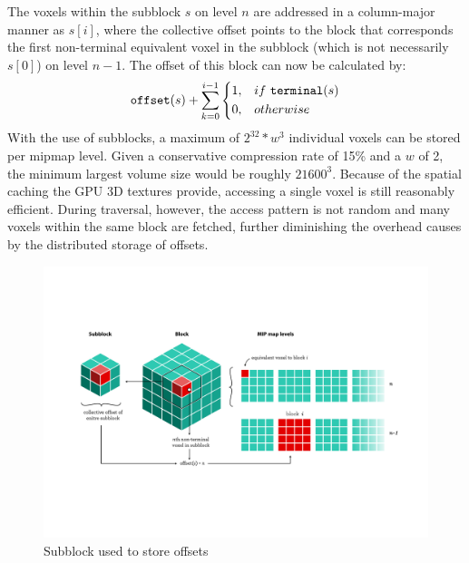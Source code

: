 The voxels within the subblock $s$ on level $n$ are addressed in a column-major manner as $s[i]$, where the collective offset points to the block that corresponds the first non-terminal equivalent voxel in the subblock (which is not necessarily $s[0]$) on level $n-1$. The offset of this block can now be calculated by:
$$ \mathtt{offset}(s) + \sum_{k=0}^{i-1} \begin{dcases} 1, &  if \ \mathtt{terminal}(s) \\  0, & otherwise \end{dcases} $$
With the use of subblocks, a maximum of $2^{32} * w^3$ individual voxels can be stored per mipmap level. Given a conservative compression rate of 15\% and a $w$ of 2, the minimum largest volume size would be roughly $21600^3$. Because of the spatial caching the GPU 3D textures provide, accessing a single voxel is still reasonably efficient. During traversal, however, the access pattern is not random and many voxels within the same block are fetched, further diminishing the overhead causes by the distributed storage of offsets.

\begin{figure}[b!]
\begin{center}
\includegraphics[scale=0.65]{figures/subblock.pdf} 
\caption{Subblock used to store offsets}
\label{fig:subblock}
\end{center}
\end{figure}

